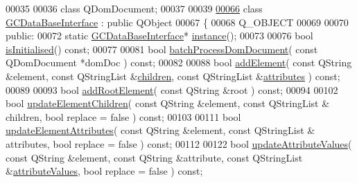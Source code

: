 \begin{DoxyCode}
00035 
00036 \textcolor{keyword}{class }QDomDocument;
00037 
00039 
\hypertarget{gcdatabaseinterface_8h_source_l00066}{}\hyperlink{class_g_c_data_base_interface}{00066} \textcolor{keyword}{class }\hyperlink{class_g_c_data_base_interface}{GCDataBaseInterface} : \textcolor{keyword}{public} QObject
00067 \{
00068   Q\_OBJECT
00069 
00070 \textcolor{keyword}{public}:
00072   \textcolor{keyword}{static} \hyperlink{class_g_c_data_base_interface}{GCDataBaseInterface}* \hyperlink{class_g_c_data_base_interface_a1baea9c0667aa8b610ec30076fcab84c}{instance}();
00073 
00076   \textcolor{keywordtype}{bool} \hyperlink{class_g_c_data_base_interface_a2d20cd6ae4f1ba007fdc1367611b97e0}{isInitialised}() \textcolor{keyword}{const};
00077 
00081   \textcolor{keywordtype}{bool} \hyperlink{class_g_c_data_base_interface_a2c20ff88464664aef988c9c0417e19be}{batchProcessDomDocument}( \textcolor{keyword}{const} QDomDocument *domDoc ) \textcolor{keyword}{const};
00082 
00088   \textcolor{keywordtype}{bool} \hyperlink{class_g_c_data_base_interface_a650cbb413d65c7b2f76fb4c8621295f7}{addElement}( \textcolor{keyword}{const} QString &element, \textcolor{keyword}{const} QStringList &\hyperlink{class_g_c_data_base_interface_aab5126783bc3acc7c718c8ffd8af62bc}{children}, \textcolor{keyword}{const} 
      QStringList &\hyperlink{class_g_c_data_base_interface_afb1e49e08f98ca453f9ac66340a35642}{attributes} ) \textcolor{keyword}{const};
00089 
00093   \textcolor{keywordtype}{bool} \hyperlink{class_g_c_data_base_interface_a83ecf5fa6efc6650c834274e0e3b3aa5}{addRootElement}( \textcolor{keyword}{const} QString &root ) \textcolor{keyword}{const};
00094 
00102   \textcolor{keywordtype}{bool} \hyperlink{class_g_c_data_base_interface_a91a60134bfb21a3f49d826340bebb852}{updateElementChildren}( \textcolor{keyword}{const} QString &element, \textcolor{keyword}{const} QStringList &
      children, \textcolor{keywordtype}{bool} replace = \textcolor{keyword}{false} ) \textcolor{keyword}{const};
00103 
00111   \textcolor{keywordtype}{bool} \hyperlink{class_g_c_data_base_interface_abc13d0cb75b233fd83575bfef575ff19}{updateElementAttributes}( \textcolor{keyword}{const} QString &element, \textcolor{keyword}{const} QStringList &
      attributes, \textcolor{keywordtype}{bool} replace = \textcolor{keyword}{false} ) \textcolor{keyword}{const};
00112 
00122   \textcolor{keywordtype}{bool} \hyperlink{class_g_c_data_base_interface_ae4f158875b5a8a109d301f19ce5d21ae}{updateAttributeValues}( \textcolor{keyword}{const} QString &element, \textcolor{keyword}{const} QString &attribute,
       \textcolor{keyword}{const} QStringList &\hyperlink{class_g_c_data_base_interface_a329e17f6c02c62fd554884f2b5a7e2df}{attributeValues}, \textcolor{keywordtype}{bool} replace = \textcolor{keyword}{false} ) \textcolor{keyword}{const};

\end{DoxyCode}
